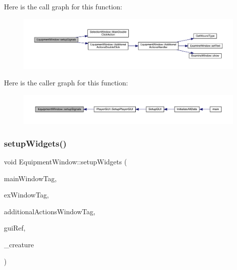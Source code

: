 Here is the call graph for this function\+:
\nopagebreak
\begin{figure}[H]
\begin{center}
\leavevmode
\includegraphics[width=350pt]{d8/dcb/class_equipment_window_ae0c437e74fb9e01a5fb0423df76e4665_cgraph}
\end{center}
\end{figure}
Here is the caller graph for this function\+:
\nopagebreak
\begin{figure}[H]
\begin{center}
\leavevmode
\includegraphics[width=350pt]{d8/dcb/class_equipment_window_ae0c437e74fb9e01a5fb0423df76e4665_icgraph}
\end{center}
\end{figure}
\mbox{\label{class_equipment_window_ad6ac175768f8725534c9b9ca1bd4d79a}} 
\subsubsection{\texorpdfstring{setup\+Widgets()}{setupWidgets()}}
{\footnotesize\ttfamily void Equipment\+Window\+::setup\+Widgets (\begin{DoxyParamCaption}\item[{const std\+::string \&}]{main\+Window\+Tag,  }\item[{const std\+::string \&}]{ex\+Window\+Tag,  }\item[{const std\+::string \&}]{additional\+Actions\+Window\+Tag,  }\item[{tgui\+::\+Gui \&}]{gui\+Ref,  }\item[{\mbox{\hyperlink{class_base_creature}{Base\+Creature}} $\ast$}]{\+\_\+creature }\end{DoxyParamCaption})}

